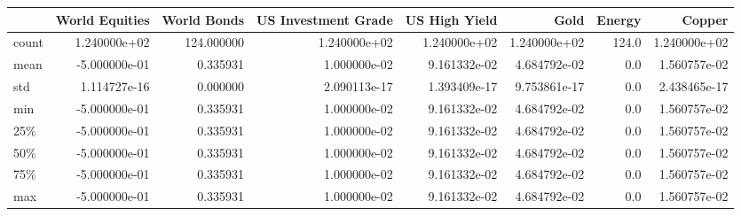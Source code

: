 \begin{tabular}{lrrrrrrr}
\toprule
{} &  World Equities &  World Bonds &  US Investment Grade &  US High Yield &          Gold &  Energy &        Copper \\
\midrule
count &    1.240000e+02 &   124.000000 &         1.240000e+02 &   1.240000e+02 &  1.240000e+02 &   124.0 &  1.240000e+02 \\
mean  &   -5.000000e-01 &     0.335931 &         1.000000e-02 &   9.161332e-02 &  4.684792e-02 &     0.0 &  1.560757e-02 \\
std   &    1.114727e-16 &     0.000000 &         2.090113e-17 &   1.393409e-17 &  9.753861e-17 &     0.0 &  2.438465e-17 \\
min   &   -5.000000e-01 &     0.335931 &         1.000000e-02 &   9.161332e-02 &  4.684792e-02 &     0.0 &  1.560757e-02 \\
25\%   &   -5.000000e-01 &     0.335931 &         1.000000e-02 &   9.161332e-02 &  4.684792e-02 &     0.0 &  1.560757e-02 \\
50\%   &   -5.000000e-01 &     0.335931 &         1.000000e-02 &   9.161332e-02 &  4.684792e-02 &     0.0 &  1.560757e-02 \\
75\%   &   -5.000000e-01 &     0.335931 &         1.000000e-02 &   9.161332e-02 &  4.684792e-02 &     0.0 &  1.560757e-02 \\
max   &   -5.000000e-01 &     0.335931 &         1.000000e-02 &   9.161332e-02 &  4.684792e-02 &     0.0 &  1.560757e-02 \\
\bottomrule
\end{tabular}
